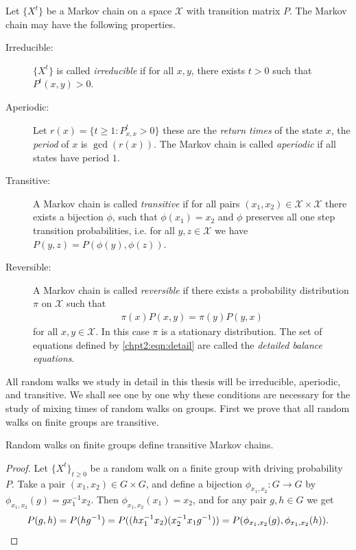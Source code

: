 \documentclass[11pt]{report}
\begin{document}
\begin{defn} 
	\label{chpt2:prop:properties}
	Let $\{X^{t}\}$ be a Markov chain on a space $\mathcal{X}$ with transition 
	matrix $P$. The Markov chain may have the following properties.
	
	
	\begin{description}
		\item[Irreducible:] $\{X^{t}\}$ is called 
		\emph{irreducible} if for all $x,y$, there exists $t>0$ such that 
		$P^{t}(x,y) >0$.
		\item[Aperiodic:] Let $r(x) = \{t\geq 1 : P^{t}_{x,x}>0\}$ these are 
		the \emph{return times} of the state $x$, the \emph{period} of $x$ 
		is $\gcd( r(x))$. 
		The Markov chain is called \emph{aperiodic} if all states have period 
		$1$.
		\item[Transitive:] A Markov chain is called \emph{transitive} if for all pairs $(x_{1},x_{2})\in \mathcal{X} \times \mathcal{X}$ 
		there exists a bijection $\phi$, such that $\phi(x_{1})=x_{2}$ and 
		$\phi$ preserves all one step transition probabilities, i.e. for all 
		$y,z \in \mathcal{X}$ we have $P(y,z) = P(\phi(y),\phi(z))$. 
		\item[Reversible:]A Markov chain is called \emph{reversible} if there exists a probability 
		distribution 
		$\pi$ on $\mathcal{X}$ such that
		\begin{eqnarray}
		\label{chpt2:eqn:detail}
		\pi(x)P(x,y)  =  \pi(y)P(y,x) 
		\end{eqnarray}
		for all $x,y \in \mathcal{X}$. In this case $\pi$ is 
		a stationary distribution. The set of equations defined by 	\eqref{chpt2:eqn:detail} are called 
		the \emph{detailed balance equations}.
	\end{description}
\end{defn}



All random walks we study in detail in this thesis will be irreducible, 
aperiodic, and transitive. We shall see one by one why these conditions are 
necessary for the study of mixing times of random walks on groups.
First we prove that all random walks on finite groups are transitive.

\begin{lemma}
	\label{chpt2:lem:groupstrans}
	Random walks on finite groups define transitive Markov chains.
\end{lemma}

\begin{proof}
	Let $\{X^{t}\}_{t\geq 0}$ be a random walk on a finite group with driving 
	probability $P$. Take a pair $(x_{1},x_{2}) \in G\times G$, and 
	define 	a bijection $\phi_{x_{1},x_{2}}:G \to G$ by $\phi_{x_{1},x_{2}}(g) =gx_{1}^{-1}x_{2}$. Then 
	$\phi_{x_{1},x_{2}}(x_{1}) 
	= x_{2}$, and for any pair $g,h \in G$ we get
	\[P(g,h) = P(hg^{-1}) =P((hx_{1}^{-1}x_{2})(x_{2}^{-1}x_{1}g^{-1})) 
	=P(\phi_{x_{1},x_{2}}(g),\phi_{x_{1},x_{2}}(h))	\qedhere .\]
\end{proof}
\end{document}

